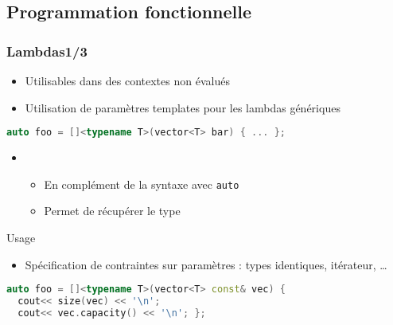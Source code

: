 \documentclass[C++.tex]{subfiles}
\begin{document}
\subsection*{Programmation fonctionnelle}
\begin{frame}[fragile]
	\frametitle{Lambdas\titlehfill{}1/3}
	\begin{itemize}
		\item Utilisables dans des contextes non évalués


		\item Utilisation de paramètres templates pour les lambdas génériques
	\end{itemize}

	\begin{lstlisting}[language=C++]
auto foo = []<typename T>(vector<T> bar) { ... };\end{lstlisting}

	\begin{itemize}
		\item [] \begin{itemize}
			\item En complément de la syntaxe avec \lstinline|auto|


			\item Permet de récupérer le type
		\end{itemize}
	\end{itemize}

	\begin{block}{Usage}
		\begin{itemize}
			\item Spécification de contraintes sur paramètres : types identiques, itérateur, \ldots
		\end{itemize}
	\end{block}

	\begin{lstlisting}[language=C++]
auto foo = []<typename T>(vector<T> const& vec) { 
  cout<< size(vec) << '\n';
  cout<< vec.capacity() << '\n'; };\end{lstlisting}

\end{frame}
\end{document}
